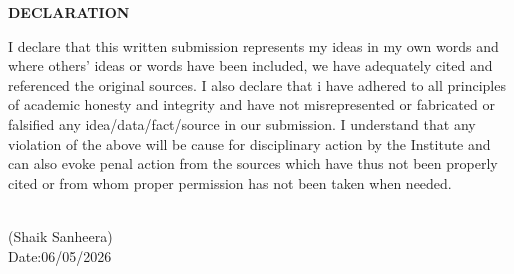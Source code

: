 \documentclass[12pt]{report}
\begin{document}
\newpage 
\begin{center} 
\Huge \textbf{DECLARATION} 
\end{center} 
\linespread{1.5} 
\large{ 
 I declare that this written submission represents my ideas in my own words and where others' ideas or words have been included, we have adequately cited and referenced the original sources. I also declare that i have adhered to all principles of academic honesty and integrity and have not misrepresented or fabricated or falsified any idea/data/fact/source in our submission. I understand that any violation of the above will be cause for disciplinary action by the Institute and can also evoke penal action from the sources which have thus not been properly cited or from whom proper permission has not been taken when needed.} 
\vspace{2.0cm} 
\begin{flushright} 
\\ 
\large{(Shaik Sanheera)}\\ 
\large{Date:06/05/2026}\\[2.0cm] 
\\ 
\large{}\\ 
\large{}\\[2.0cm] 
\\ 
\large{}\\ 
\large{}\\[2.0cm] 
\end{flushright} 

 
\end{document}
